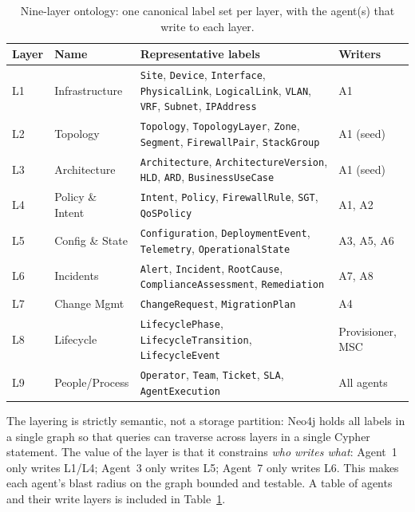 \documentclass[acmtog]{acmart}
\renewcommand\_{\textunderscore\allowbreak}
\begin{document}
\begin{table}[t]
\small
\centering
\caption{Nine-layer ontology: one canonical label set per layer, with the
agent(s) that write to each layer.}
\label{tab:layers}
\begin{tabularx}{\textwidth}{@{}l l X l@{}}
\toprule
\textbf{Layer} & \textbf{Name} & \textbf{Representative labels} & \textbf{Writers}\\
\midrule
L1 & Infrastructure &
  \texttt{Site}, \texttt{Device}, \texttt{Interface},
  \texttt{PhysicalLink}, \texttt{LogicalLink}, \texttt{VLAN},
  \texttt{VRF}, \texttt{Subnet}, \texttt{IPAddress} &
  A1\\
L2 & Topology &
  \texttt{Topology}, \texttt{TopologyLayer}, \texttt{Zone},
  \texttt{Segment}, \texttt{FirewallPair}, \texttt{StackGroup} &
  A1 (seed)\\
L3 & Architecture &
  \texttt{Architecture}, \texttt{ArchitectureVersion},
  \texttt{HLD}, \texttt{ARD}, \texttt{BusinessUseCase} &
  A1 (seed)\\
L4 & Policy \& Intent &
  \texttt{Intent}, \texttt{Policy}, \texttt{FirewallRule},
  \texttt{SGT}, \texttt{QoSPolicy} &
  A1, A2\\
L5 & Config \& State &
  \texttt{Configuration}, \texttt{DeploymentEvent},
  \texttt{Telemetry}, \texttt{OperationalState} &
  A3, A5, A6\\
L6 & Incidents &
  \texttt{Alert}, \texttt{Incident}, \texttt{RootCause},
  \texttt{ComplianceAssessment}, \texttt{Remediation} &
  A7, A8\\
L7 & Change Mgmt &
  \texttt{ChangeRequest}, \texttt{MigrationPlan} &
  A4\\
L8 & Lifecycle &
  \texttt{LifecyclePhase}, \texttt{LifecycleTransition},
  \texttt{LifecycleEvent} &
  Provisioner, MSC\\
L9 & People/Process &
  \texttt{Operator}, \texttt{Team}, \texttt{Ticket},
  \texttt{SLA}, \texttt{AgentExecution} &
  All agents\\
\bottomrule
\end{tabularx}
\end{table}

The layering is strictly semantic, not a storage partition: Neo4j
holds all labels in a single graph so that queries can traverse
across layers in a single Cypher statement. The value of the layer
is that it constrains \emph{who writes what}: Agent~1 only writes
L1/L4; Agent~3 only writes L5; Agent~7 only writes L6. This makes
each agent's blast radius on the graph bounded and testable. A
table of agents and their write layers is included in
Table~\ref{tab:layers}.
\end{document}
